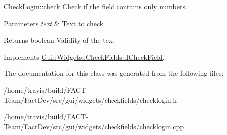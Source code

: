\hyperlink{classGui_1_1Widgets_1_1CheckFields_1_1CheckLogin_a66e6d426253b5219a55b7ccada37d9b9}{Check\-Login\-::check} Check if the field contains only numbers. 


\begin{DoxyParams}{Parameters}
{\em text} & Text to check \\
\hline
\end{DoxyParams}
\begin{DoxyReturn}{Returns}
boolean Validity of the text 
\end{DoxyReturn}


Implements \hyperlink{classGui_1_1Widgets_1_1CheckFields_1_1ICheckField_a818700a4a8c95eacfc39b85c74e71144}{Gui\-::\-Widgets\-::\-Check\-Fields\-::\-I\-Check\-Field}.



The documentation for this class was generated from the following files\-:\begin{DoxyCompactItemize}
\item 
/home/travis/build/\-F\-A\-C\-T-\/\-Team/\-Fact\-Dev/src/gui/widgets/checkfields/checklogin.\-h\item 
/home/travis/build/\-F\-A\-C\-T-\/\-Team/\-Fact\-Dev/src/gui/widgets/checkfields/checklogin.\-cpp\end{DoxyCompactItemize}
